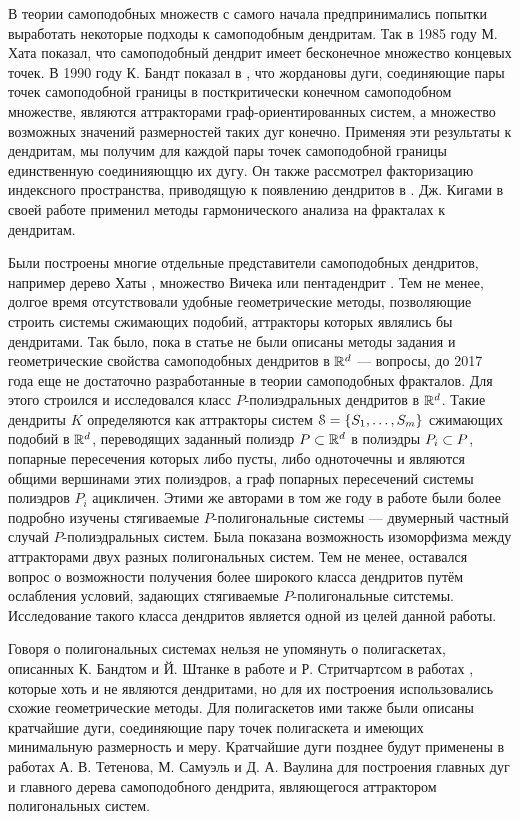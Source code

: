 В теории самоподобных множеств с самого начала предпринимались попытки выработать некоторые подходы к самоподобным дендритам.
Так в 1985 году М. Хата \cite{Hata1985} показал, что самоподобный дендрит имеет бесконечное множество концевых точек.
В 1990 году К. Бандт показал в \cite{SSS6}, что жордановы дуги, соединяющие пары точек самоподобной границы в посткритически конечном самоподобном множестве, являются аттракторами граф-ориентированных систем, а множество возможных значений размерностей таких дуг конечно.
Применяя эти результаты к дендритам, мы получим для каждой пары точек самоподобной границы единственную соединияющцю их дугу.
Он также рассмотрел факторизацию индексного пространства, приводящую к появлению дендритов в \cite{SSS2}.
Дж. Кигами в своей работе \cite{Kig95} применил методы гармонического анализа на фракталах к дендритам. 

Были построены многие отдельные представители самоподобных дендритов, например дерево Хаты \cite{Hata1985}, множество Вичека или пентадендрит \cite{McWorter1987}.
Тем не менее, долгое время отсутствовали удобные геометрические методы, позволяющие строить системы сжимающих подобий, аттракторы которых являлись бы дендритами.
Так было, пока  в статье \cite{TSV2017} не были описаны методы задания и геометрические свойства самоподобных дендритов в $\mathbb{R}^d$ --- вопросы, до 2017 года еще не достаточно разработанные в теории самоподобных фракталов. 
Для этого строился и исследовался класс $P$-полиэдральных дендритов в $\mathbb{R}^d$. 
Такие дендриты $K$ определяются как аттракторы систем ${\EuScript S} = \{S_1,\ldots, S_m\}$ сжимающих подобий в $\mathbb{R}^d$, переводящих заданный полиэдр $P \subset \mathbb{R}^d$ в полиэдры $P_i \subset P$, попарные пересечения которых либо пусты, либо одноточечны и являются общими вершинами этих полиэдров, а граф попарных пересечений системы полиэдров $P_i$ ацикличен.
Этими же авторами в том же году в работе \cite{STV2017} были более подробно изучены стягиваемые $P$-полигональные системы --- двумерный частный случай $P$-полиэдральных систем.
Была показана возможность изоморфизма между аттракторами двух разных полигональных систем.
Тем не менее, оставался вопрос о возможности получения более широкого класса дендритов путём ослабления условий, задающих стягиваемые $P$-полигональные ситстемы. 
Исследование такого класса дендритов является одной из целей данной работы.

Говоря о полигональных системах нельзя не упомянуть о полигаскетах, описанных К. Бандтом и Й. Штанке в работе \cite{SSS6} и Р. Стритчартсом в работах \cite{strich1999, Strichartz1999}, которые хоть и не являются дендритами, но для их построения использовались схожие геометрические методы.
Для полигаскетов ими также были описаны кратчайшие дуги, соединяющие пару точек полигаскета и имеющих минимальную размерность и меру.
Кратчайшие дуги позднее будут применены в работах \cite{TSV2017, STV2017} А. В. Тетенова, М. Самуэль и Д. А. Ваулина для построения главных дуг и главного дерева самоподобного дендрита, являющегося аттрактором полигональных систем.

